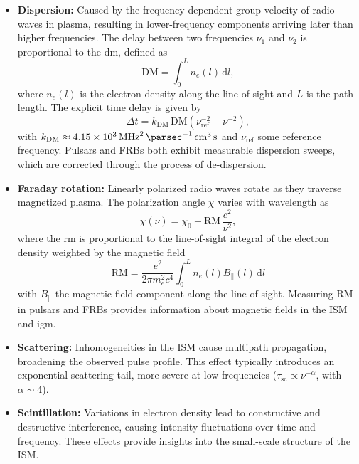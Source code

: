 \begin{itemize}
    \item \textbf{Dispersion:} Caused by the frequency-dependent group velocity of radio waves in plasma, resulting in lower-frequency components arriving later than higher frequencies. The delay between two frequencies $\nu_1$ and $\nu_2$ is proportional to the \gls{dm}, defined as
    \begin{equation}
        \mathrm{DM} = \int_0^L n_e(l) \, \mathrm{d}l ,
    \end{equation}
    where $n_e(l)$ is the electron density along the line of sight and $L$ is the path length. The explicit time delay is given by
	\begin{equation}
		\Delta t = k_{\text{DM}} \, \mathrm{DM} \left( \nu_\text{ref}^{-2} - \nu^{-2} \right) ,
	\end{equation}
	with $k_{\text{DM}} \approx \SI{4.15e3}{\mega \hertz \squared \, \parsec^{-1} \, \centi \meter^{3} \, \second}$ and $\nu_\text{ref} $ some reference frequency. Pulsars and FRBs both exhibit measurable dispersion sweeps, which are corrected through the process of de-dispersion.

	\item \textbf{Faraday rotation:} Linearly polarized radio waves rotate as they traverse magnetized plasma. The polarization angle $\chi$ varies with wavelength as
	\begin{equation}
		\chi(\nu) = \chi_0 + \mathrm{RM} \, \frac{c^2}{\nu^2} ,
		\end{equation}
    where the \gls{rm} is proportional to the line-of-sight integral of the electron density weighted by the magnetic field \citep{RM}
	\begin{equation}
		\mathrm{RM} = \frac{e^2}{2\pi m_e^2 c^4} \int_0^L n_e(l) B_\parallel(l) \, \mathrm{d}l 
	\end{equation}
	with $B_\parallel$ the magnetic field component along the line of sight. Measuring RM in pulsars and FRBs provides information about magnetic fields in the ISM and \gls{igm}.

    \item \textbf{Scattering:} Inhomogeneities in the ISM cause multipath propagation, broadening the observed pulse profile. This effect typically introduces an exponential scattering tail, more severe at low frequencies ($\tau_{\text{sc}} \propto \nu^{-\alpha}$, with $\alpha \sim 4$).
    \item \textbf{Scintillation:} Variations in electron density lead to constructive and destructive interference, causing intensity fluctuations over time and frequency. These effects provide insights into the small-scale structure of the ISM.
\end{itemize}



